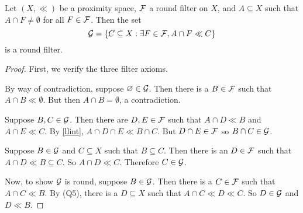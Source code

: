 \begin{lemma}
	\label{Ground}
	Let \( (X, \ll) \) be a proximity space, \( \mathcal{F} \) a round filter on \( X \), and \( A \subseteq X \) such that \( A \cap F \neq \emptyset \) for all \( F \in \mathcal{F} \).  Then the set
	\[ \mathcal{G} = \{ C \subseteq X : \exists F \in \mathcal{F}, A \cap F \ll C \} \]
	is a round filter.
\end{lemma}
\begin{proof}
	First, we verify the three filter axioms.

	By way of contradiction, suppose \( \varnothing \in \mathcal{G} \).  Then there is a \( B \in \mathcal{F} \) such that \( A \cap B \ll \emptyset \).  But then \( A \cap B = \emptyset \), a contradiction.
	
	Suppose \( B,C \in \mathcal{G} \).  Then there are \( D,E \in \mathcal{F} \) such that \( A \cap D \ll B \) and \( A \cap E \ll C \).  By \ref{llint}, \( A \cap D \cap E \ll B \cap C \).  But \( D \cap E \in \mathcal{F} \) so \( B \cap C \in \mathcal{G} \).
	
	Suppose \( B \in \mathcal{G} \) and \( C \subseteq X \) such that \( B \subseteq C \).  Then there is an \( D \in \mathcal{F} \) such that \( A \cap D \ll B \subseteq C \).  So \( A \cap D \ll C \).  Therefore \( C \in \mathcal{G} \).
	
	Now, to show \( \mathcal{G} \) is round, suppose \( B \in \mathcal{G} \).  Then there is a \( C \in \mathcal{F} \) such that \( A \cap C \ll B \).  By (Q5), there is a \( D \subseteq X \) such that \( A \cap C \ll D \ll C \).  So \( D \in \mathcal{G} \) and \( D \ll B \).
\end{proof}

